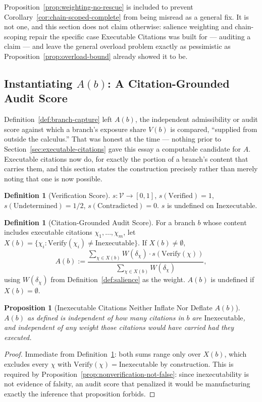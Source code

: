 \documentclass[11pt]{article}
\newtheorem{proposition}[theorem]{Proposition}
\theoremstyle{definition}
\newtheorem{definition}[theorem]{Definition}
\begin{document}
Proposition~\ref{prop:weighting-no-rescue} is included to prevent Corollary~\ref{cor:chain-scoped-complete} from being misread as a general fix. It is not one, and this section does not claim otherwise: salience weighting and chain-scoping repair the specific case Executable Citations was built for --- auditing a claim --- and leave the general overload problem exactly as pessimistic as Proposition~\ref{prop:overload-bound} already showed it to be.

\subsection{Instantiating $A(b)$: A Citation-Grounded Audit Score}
\label{sec:audit-score}

Definition~\ref{def:branch-capture} left $A(b)$, the independent admissibility or audit score against which a branch's exposure share $V(b)$ is compared, ``supplied from outside the calculus.'' That was honest at the time --- nothing prior to Section~\ref{sec:executable-citations} gave this essay a computable candidate for $A$. Executable citations now do, for exactly the portion of a branch's content that carries them, and this section states the construction precisely rather than merely noting that one is now possible.

\begin{definition}[Verification Score]
\label{def:verification-score}
$s : \mathcal{V} \to [0,1]$, $s(\mathrm{Verified}) = 1$, $s(\mathrm{Undetermined}) = 1/2$, $s(\mathrm{Contradicted}) = 0$. $s$ is undefined on $\mathrm{Inexecutable}$.
\end{definition}

\begin{definition}[Citation-Grounded Audit Score]
\label{def:citation-audit-score}
For a branch $b$ whose content includes executable citations $\chi_1, \ldots, \chi_m$, let $X(b) = \{\chi_i : \mathrm{Verify}(\chi_i) \neq \mathrm{Inexecutable}\}$. If $X(b) \neq \emptyset$,
\[
A(b) := \frac{\sum_{\chi \in X(b)} W(\delta_\chi) \cdot s(\mathrm{Verify}(\chi))}{\sum_{\chi \in X(b)} W(\delta_\chi)},
\]
using $W(\delta_\chi)$ from Definition~\ref{def:salience} as the weight. $A(b)$ is undefined if $X(b) = \emptyset$.
\end{definition}

\begin{proposition}[Inexecutable Citations Neither Inflate Nor Deflate $A(b)$]
\label{prop:inexecutable-excluded}
$A(b)$ as defined is independent of how many citations in $b$ are $\mathrm{Inexecutable}$, and independent of any weight those citations would have carried had they executed.
\end{proposition}
\begin{proof}
Immediate from Definition~\ref{def:citation-audit-score}: both sums range only over $X(b)$, which excludes every $\chi$ with $\mathrm{Verify}(\chi) = \mathrm{Inexecutable}$ by construction. This is required by Proposition~\ref{prop:nonverification-not-false}: since inexecutability is not evidence of falsity, an audit score that penalized it would be manufacturing exactly the inference that proposition forbids.
\end{proof}
\end{document}
